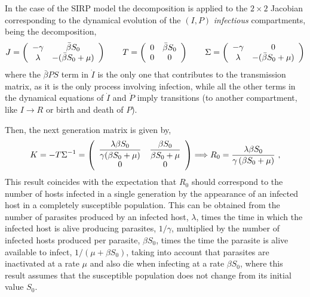 In the case of the SIRP model the decomposition is applied to the $2\times 2$
Jacobian corresponding to the dynamical evolution of the $(I,P)$
\textit{infectious} compartments, being the decomposition,
\begin{equation*}
    J=\left(\begin{array}{cc}
            -\gamma & \bar{\beta} S_0        \\
            \lambda & -(\bar{\beta} S_0+\mu)\end{array}\right)\qquad
    T=\left(\begin{array}{cc}
            0 & \bar{\beta} S_0 \\
            0 & 0
        \end{array}\right) \qquad \Sigma=\left(\begin{array}{cc}
            -\gamma & 0                        \\
            \lambda & -(\bar{\beta} S_0 + \mu)
        \end{array}\right)
\end{equation*}
where the $\bar{\beta} PS$ term in $\dot{I}$ is the only one that contributes
to the transmission matrix, as it is the only process involving infection,
while all the other terms in the dynamical equations of $\dot{I}$ and $\dot{P}$
imply transitions (to another compartment, like $I\rightarrow R$ or birth and
death of $P$).

Then, the next generation matrix is given by,
\begin{equation*}
    K=- T\Sigma^{-1}=\left(\begin{array}{cc}
            \displaystyle \frac{\lambda\beta S_0}{\gamma(\beta S_0 + \mu)} &
            \displaystyle \frac{\beta S_0}{\beta S_0 + \mu}
            \\
            0                                                              & 0
        \end{array}\right) \Longrightarrow R_0=\frac{\lambda \beta
        S_0}{\gamma\left(\beta S_0+\mu\right)} \ ,
\end{equation*}
This result coincides with the expectation that $R_0$ should correspond to the
number of  hosts infected in a single generation by the appearance of an
infected host in a completely susceptible population. This can be obtained from
the number of parasites produced by an infected host, $\lambda$, times the time
in which the infected host is alive producing parasites, $1/\gamma$, multiplied
by the number of infected hosts produced per parasite, $\beta S_0$, times the
time the parasite is alive available to infect, $1/(\mu+\beta S_0)$, taking
into account that parasites are inactivated at a rate $\mu$ and also die when
infecting at a rate $\beta S_0$, where this result assumes that the susceptible
population does not change from its initial value $S_0$.


